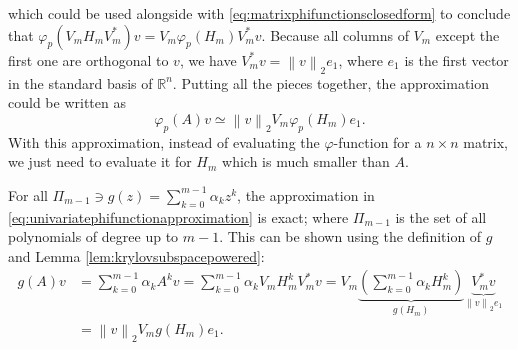 which could be used alongside with \eqref{eq:matrixphifunctionsclosedform} to conclude that $\varphi_p(V_m H_m V_m^*)v = V_m \varphi_p(H_m) V_m^* v$.
Because all columns of $V_m$ except the first one are orthogonal to $v$, we have $V_m^* v = \left\| v \right\|_{2} e_1$,
where $e_1$ is the first vector in the standard basis of $\mathbb{R}^n$. Putting all the pieces together, the approximation could be written as
\begin{equation}
    \label{eq:univariatephifunctionapproximation}
    \varphi_p(A)v \simeq \left\| v \right\|_{2} V_m \varphi_p(H_m) e_1.
\end{equation}
With this approximation, instead of evaluating the $\varphi$-function for a $n \times n$ matrix,
we just need to evaluate it for $H_m$ which is much smaller than $A$.

\begin{corollary}
    \label{cor:univariateerrorestimationpolynomial}
    For all $\Pi_{m-1} \ni g(z) = \sum_{k=0}^{m-1}{\alpha_k} z^k$, the approximation in \eqref{eq:univariatephifunctionapproximation} is exact;
    where $\Pi_{m-1}$ is the set of all polynomials of degree up to $m-1$.
    This can be shown using the definition of $g$ and Lemma \ref{lem:krylovsubspacepowered}:
    \begin{equation*}
        \begin{aligned}
            g(A) v & = \sum_{k=0}^{m-1}{\alpha_k A^k v}
            = \sum_{k=0}^{m-1}{\alpha_k V_m H_m^k V_m^* v}
            = V_m \underset{g(H_m)}{\underbrace{\left( \sum_{k=0}^{m-1}{\alpha_k H_m^k } \right)}}
            \underset{\left\| v \right\|_2 e_1}{\underbrace{V_m^* v}}\\
            & = \left\| v \right\|_2 V_m g(H_m) e_1.
        \end{aligned}
    \end{equation*}
\end{corollary}

